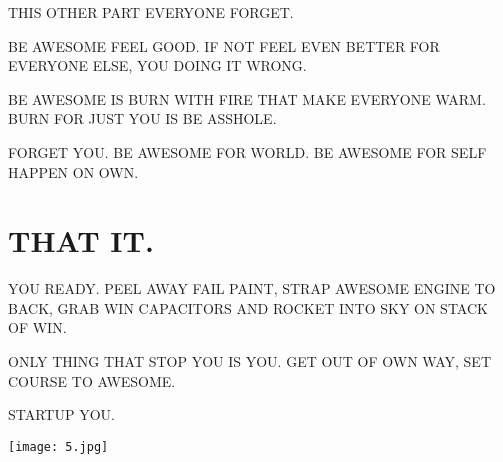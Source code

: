 \documentclass{article}
\begin{document}
THIS OTHER PART EVERYONE FORGET.

BE AWESOME FEEL GOOD. IF NOT FEEL EVEN BETTER FOR EVERYONE ELSE, YOU
DOING IT WRONG.

BE AWESOME IS BURN WITH FIRE THAT MAKE EVERYONE WARM. BURN FOR JUST
YOU IS BE ASSHOLE.

FORGET YOU. BE AWESOME FOR WORLD. BE AWESOME FOR SELF HAPPEN ON OWN.

\section*{THAT IT.}

YOU READY. PEEL AWAY FAIL PAINT, STRAP AWESOME ENGINE TO BACK, GRAB
WIN CAPACITORS AND ROCKET INTO SKY ON STACK OF WIN.

ONLY THING THAT STOP YOU IS YOU. GET OUT OF OWN WAY, SET COURSE TO
AWESOME.

STARTUP YOU.

\texttt{[image: 5.jpg]}
\end{document}
